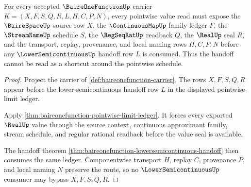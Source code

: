 \begin{theorem}
\label{thm:baireonefunction-pointwise-schedule-obligations}
For every accepted $\BaireOneFunctionUp$ carrier $K=(X,F,S,Q,R,L,H,C,P,N)$, every pointwise value read must expose the $\BaireSpaceUp$ source row $X$, the $\ContinuousMapUp$ family ledger $F$, the $\StreamNameUp$ schedule $S$, the $\RegSeqRatUp$ readback $Q$, the $\RealUp$ seal $R$, and the transport, replay, provenance, and local naming rows $H,C,P,N$ before any $\LowerSemicontinuousUp$ handoff row $L$ is consumed. Thus the handoff cannot be read as a shortcut around the pointwise schedule.
\end{theorem}
\begin{proof}
Project the carrier of \autoref{def:baireonefunction-carrier}. The rows $X,F,S,Q,R$ appear before the lower-semicontinuous handoff row $L$ in the displayed pointwise-limit ledger.

Apply \autoref{thm:baireonefunction-pointwise-limit-ledger}. It forces every exported $\RealUp$ value through the source context, continuous approximant family, stream schedule, and regular rational readback before the value seal is available.

The handoff theorem \autoref{thm:baireonefunction-lowersemicontinuous-handoff} then consumes the same ledger. Componentwise transport $H$, replay $C$, provenance $P$, and local naming $N$ preserve the route, so no $\LowerSemicontinuousUp$ consumer may bypass $X,F,S,Q,R$.
\end{proof}

